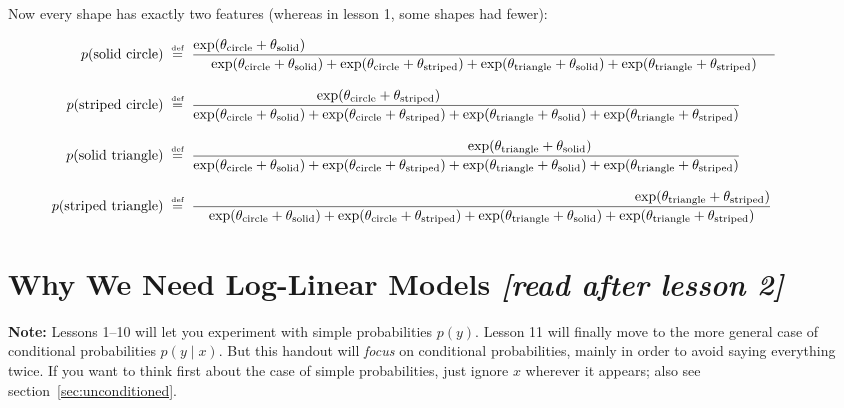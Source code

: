 \documentclass[11pt]{article}
\newcommand{\defeq}{\;\stackrel{\mbox{\tiny def}}{=}\;}
\begin{document}
Now every shape has exactly two features (whereas in lesson 1, some shapes had fewer):

\begin{align*}
\hspace{-12mm}p(\text{solid circle}) & \defeq \frac{\exp (\theta_{\textrm{circle}}+\theta_{\textrm{solid}})\hspace{118mm}}{\exp (\theta_{\textrm{circle}} + \theta_{\textrm{solid}}) + \exp (\theta_{\textrm{circle}} + \theta_{\textrm{striped}}) + \exp (\theta_{\textrm{triangle}} + \theta_{\textrm{solid}}) + \exp (\theta_{\textrm{triangle}} + \theta_{\textrm{striped}})} \\
\rule{0in}{1.5\baselineskip}
\hspace{-12mm}p(\text{striped circle}) & \defeq \frac{\exp (\theta_{\textrm{circle}}+\theta_{\textrm{striped}})\hspace{44mm}}{\exp (\theta_{\textrm{circle}} + \theta_{\textrm{solid}}) + \exp (\theta_{\textrm{circle}} + \theta_{\textrm{striped}}) + \exp (\theta_{\textrm{triangle}} + \theta_{\textrm{solid}}) + \exp (\theta_{\textrm{triangle}} + \theta_{\textrm{striped}})} \\
\rule{0in}{1.5\baselineskip}
\hspace{-12mm}p(\text{solid triangle}) & \defeq \frac{\hspace{32mm}\exp (\theta_{\textrm{triangle}}+\theta_{\textrm{solid}})}{\exp (\theta_{\textrm{circle}} + \theta_{\textrm{solid}}) + \exp (\theta_{\textrm{circle}} + \theta_{\textrm{striped}}) + \exp (\theta_{\textrm{triangle}} + \theta_{\textrm{solid}}) + \exp (\theta_{\textrm{triangle}} + \theta_{\textrm{striped}})} \\
\rule{0in}{1.5\baselineskip}
\hspace{-12mm}p(\text{striped triangle}) & \defeq \frac{\hspace{111mm}\exp (\theta_{\textrm{triangle}}+\theta_{\textrm{striped}})}{\exp (\theta_{\textrm{circle}} + \theta_{\textrm{solid}}) + \exp (\theta_{\textrm{circle}} + \theta_{\textrm{striped}}) + \exp (\theta_{\textrm{triangle}} + \theta_{\textrm{solid}}) + \exp (\theta_{\textrm{triangle}} + \theta_{\textrm{striped}})} 
\end{align*}

\section{Why We Need Log-Linear Models {\em [read after lesson 2]}}

{\bf Note:} Lessons 1--10 will let you experiment with simple
probabilities $p(y)$.  Lesson 11 will finally move to the more general
case of conditional probabilities $p(y\mid x)$.  But this handout will
{\em focus} on conditional probabilities, mainly in order to avoid saying
everything twice.  If you want to think first about the case of simple
probabilities, just ignore $x$ wherever it appears; also see
section~\ref{sec:unconditioned}.
\end{document}
